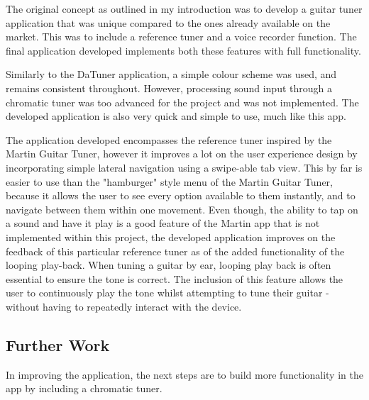\documentclass[conference]{acmsiggraph}
\begin{document}
The original concept as outlined in my introduction was to develop a guitar tuner application that was unique compared to the ones already available on the market. This was to include a reference tuner and a voice recorder function. The final application developed implements both these features with full functionality. 

Similarly to the DaTuner application, a simple colour scheme was used, and remains consistent throughout. However, processing sound input through a chromatic tuner was too advanced for the project and was not implemented. The developed application is also very quick and simple to use, much like this app.

The application developed encompasses the reference tuner inspired by the Martin Guitar Tuner, however it improves a lot on the user experience design by incorporating simple lateral navigation using a swipe-able tab view. This by far is easier to use than the "hamburger" style menu of the Martin Guitar Tuner, because it allows the user to see every option available to them instantly, and to navigate between them within one movement. Even though, the ability to tap on a sound and have it play is a good feature of the Martin app that is not implemented within this project, the developed application improves on the feedback of this particular reference tuner as of the added functionality of the looping play-back. When tuning a guitar by ear, looping play back is often essential to ensure the tone is correct. The inclusion of this feature allows the user to continuously play the tone whilst attempting to tune their guitar - without having to repeatedly interact with the device.


\subsection{Further Work}

In improving the application, the next steps are to build more functionality in the app by including a chromatic tuner. 
\end{document}
